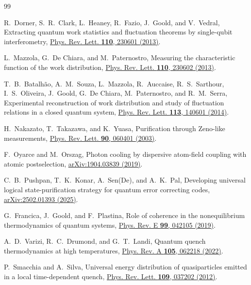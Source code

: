 \documentclass[aps,pra,reprint,superscriptaddress,longbibliography]{revtex4-2}
\begin{document}
\begin{thebibliography}{99}

R.~Dorner, S.~R.~Clark, L.~Heaney, R.~Fazio, J.~Goold, and V.~Vedral,
Extracting quantum work statistics and fluctuation theorems by
single-qubit interferometry,
\href{https://doi.org/10.1103/PhysRevLett.110.230601}
{Phys. Rev. Lett. \textbf{110}, 230601 (2013)}.

L.~Mazzola, G.~De Chiara, and M.~Paternostro,
Measuring the characteristic function of the work distribution,
\href{https://doi.org/10.1103/PhysRevLett.110.230602}
{Phys. Rev. Lett. \textbf{110}, 230602 (2013)}.

T.~B.~Batalh\~ao, A.~M.~Souza, L.~Mazzola, R.~Auccaise,
R.~S.~Sarthour, I.~S.~Oliveira, J.~Goold, G.~De Chiara,
M.~Paternostro, and R.~M.~Serra,
Experimental reconstruction of work distribution and study of
fluctuation relations in a closed quantum system,
\href{https://doi.org/10.1103/PhysRevLett.113.140601}
{Phys. Rev. Lett. \textbf{113}, 140601 (2014)}.

H.~Nakazato, T.~Takazawa, and K.~Yuasa,
Purification through Zeno-like measurements,
\href{https://doi.org/10.1103/PhysRevLett.90.060401}
{Phys. Rev. Lett. \textbf{90}, 060401 (2003)}.

F.~Oyarce and M.~Orszag,
Photon cooling by dispersive atom-field coupling with atomic postselection,
\href{https://arxiv.org/abs/1904.03839}{arXiv:1904.03839 (2019)}.

C.~B.~Pushpan, T.~K.~Konar, A.~Sen(De), and A.~K.~Pal,
Developing universal logical state-purification strategy for quantum
error correcting codes,
\href{https://arxiv.org/abs/2502.01393}{arXiv:2502.01393 (2025)}.

G.~Francica, J.~Goold, and F.~Plastina,
Role of coherence in the nonequilibrium thermodynamics of quantum systems,
\href{https://doi.org/10.1103/PhysRevE.99.042105}
{Phys. Rev. E \textbf{99}, 042105 (2019)}.

A.~D.~Varizi, R.~C.~Drumond, and G.~T.~Landi,
Quantum quench thermodynamics at high temperatures,
\href{https://doi.org/10.1103/PhysRevA.105.062218}
{Phys. Rev. A \textbf{105}, 062218 (2022)}.

P.~Smacchia and A.~Silva,
Universal energy distribution of quasiparticles emitted in a local
time-dependent quench,
\href{https://doi.org/10.1103/PhysRevLett.109.037202}
{Phys. Rev. Lett. \textbf{109}, 037202 (2012)}.


\end{thebibliography}
\end{document}

